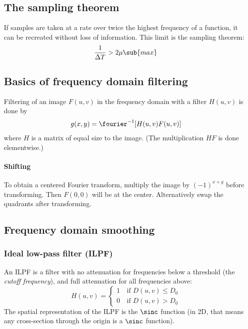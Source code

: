\subsection{The sampling theorem}
If samples are taken at a rate over twice the highest frequency of a function, it can be recreated without loss of information. This limit is the sampling theorem:
\begin{equation}
    \frac{1}{\Delta T} > 2 \mu\sub{max}
\end{equation}

\subsection{Basics of frequency domain filtering}
Filtering of an image $F(u,v)$ in the frequency domain with a filter $H(u,v)$ is done by
\begin{equation}
    g(x,y) = \fourier^{-1}[H(u,v) F(u,v)]
\end{equation}
where $H$ is a matrix of equal size to the image. (The multiplication $H F$ is done elementwise.)

\paragraph{Shifting}
To obtain a centered Fourier transform, multiply the image by $(-1)^{x+y}$ before transforming. Then $F(0,0)$ will be at the center. Alternatively swap the quadrants after transforming.

\subsection{Frequency domain smoothing}

\subsubsection{Ideal low-pass filter (ILPF)}
An ILPF is a filter with no attenuation for frequencies below a threshold (the \emph{cutoff frequency}), and full attenuation for all frequencies above:
\begin{equation}
    H(u,v) =
    \begin{cases}
        1 \quad\mbox{if } D(u,v) \leq D_0 \\
        0 \quad\mbox{if } D(u,v) >    D_0
    \end{cases}
\end{equation}
The spatial representation of the ILPF is the $\sinc$ function (in 2D, that means any cross-section through the origin is a $\sinc$ function).

